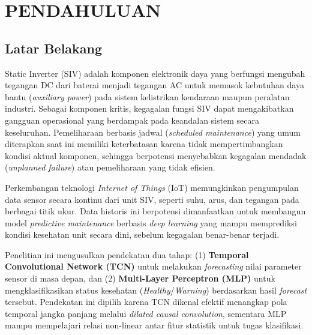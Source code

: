\documentclass[12pt,a4paper]{report}
\begin{document}
\tableofcontents
\listoffigures
\listoftables

\newpage

\chapter{PENDAHULUAN}

\section{Latar Belakang}
Static Inverter (SIV) adalah komponen elektronik daya yang berfungsi mengubah tegangan DC dari baterai menjadi tegangan AC untuk memasok kebutuhan daya bantu (\textit{auxiliary power}) pada sistem kelistrikan kendaraan maupun peralatan industri. Sebagai komponen kritis, kegagalan fungsi SIV dapat mengakibatkan gangguan operasional yang berdampak pada keandalan sistem secara keseluruhan. Pemeliharaan berbasis jadwal (\textit{scheduled maintenance}) yang umum diterapkan saat ini memiliki keterbatasan karena tidak mempertimbangkan kondisi aktual komponen, sehingga berpotensi menyebabkan kegagalan mendadak (\textit{unplanned failure}) atau pemeliharaan yang tidak efisien.

Perkembangan teknologi \textit{Internet of Things} (IoT) memungkinkan pengumpulan data sensor secara kontinu dari unit SIV, seperti suhu, arus, dan tegangan pada berbagai titik ukur. Data historis ini berpotensi dimanfaatkan untuk membangun model \textit{predictive maintenance} berbasis \textit{deep learning} yang mampu memprediksi kondisi kesehatan unit secara dini, sebelum kegagalan benar-benar terjadi.

Penelitian ini mengusulkan pendekatan dua tahap: (1) \textbf{Temporal Convolutional Network (TCN)} untuk melakukan \textit{forecasting} nilai parameter sensor di masa depan, dan (2) \textbf{Multi-Layer Perceptron (MLP)} untuk mengklasifikasikan status kesehatan (\textit{Healthy}/\textit{Warning}) berdasarkan hasil \textit{forecast} tersebut. Pendekatan ini dipilih karena TCN dikenal efektif menangkap pola temporal jangka panjang melalui \textit{dilated causal convolution}, sementara MLP mampu mempelajari relasi non-linear antar fitur statistik untuk tugas klasifikasi.
\end{document}
